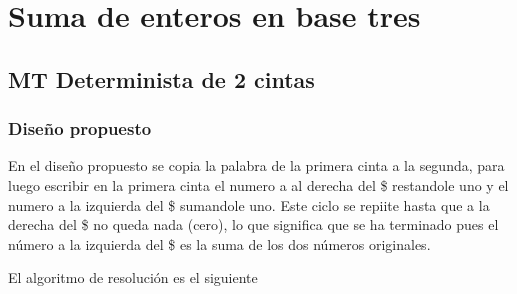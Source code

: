 \section{Suma de enteros en base tres}


\subsection{MT Determinista de 2 cintas}

\subsubsection*{Diseño propuesto}

En el diseño propuesto se copia la palabra de la primera cinta a la segunda, para luego escribir en la primera cinta el numero a al derecha del \$ restandole uno y el numero a la izquierda del \$ sumandole uno. Este ciclo se repiite hasta que a la derecha del \$ no queda nada (cero), lo que significa que se ha terminado pues el número a la izquierda del \$ es la suma de los dos números originales.\medskip

El algoritmo de resolución es el siguiente

